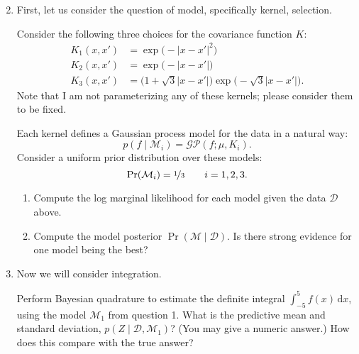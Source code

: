 \documentclass{article}
\newcommand{\given}{\mid}
\newcommand{\mc}[1]{\mathcal{#1}}
\newcommand{\data}{\mc{D}}
\newcommand{\model}{\mc{M}}
\newcommand{\intd}[1]{\,\mathrm{d}{#1}}
\begin{document}
\begin{enumerate}
\setcounter{enumi}{1}
\item
  First, let us consider the question of model, specifically kernel, selection.

  Consider the following three choices for the covariance function $K$:
  \begin{align*}
    K_1(x, x') &= \exp\bigl(-\lvert x - x' \rvert^2\bigr) \\
    K_2(x, x') &= \exp\bigl(-\lvert x - x' \rvert\bigr) \\
    K_3(x, x') &= \bigl(1 + \sqrt{3} \lvert x - x' \rvert\bigr)
                  \exp\bigl(-\sqrt{3} \lvert x - x' \rvert\bigr).
  \end{align*}
  Note that I am not parameterizing any of these kernels; please consider them
  to be fixed.

  Each kernel defines a Gaussian process model for the data in a natural way:
  \[p(f \given \model_i) = \mc{GP}(f; \mu, K_i).\]
  Consider a uniform prior distribution over these models:
  \[\Pr(\model_i) = \nicefrac{1}{3} \qquad i = 1, 2, 3.\]

  \begin{enumerate}
  \item
    Compute the log marginal likelihood for each model given the data $\data$
    above.
  \item
    Compute the model posterior $\Pr(\model \given \data)$. Is there strong
    evidence for one model being the best?
  \end{enumerate}

\item
  Now we will consider integration.

  Perform Bayesian quadrature to estimate the definite integral $\int_{-5}^5
  f(x) \intd{x}$, using the model $\model_1$ from question 1.  What is the
  predictive mean and standard deviation, $p(Z \given \data, \model_1)$?  (You
  may give a numeric answer.)  How does this compare with the true answer?

\end{enumerate}
\end{document}
